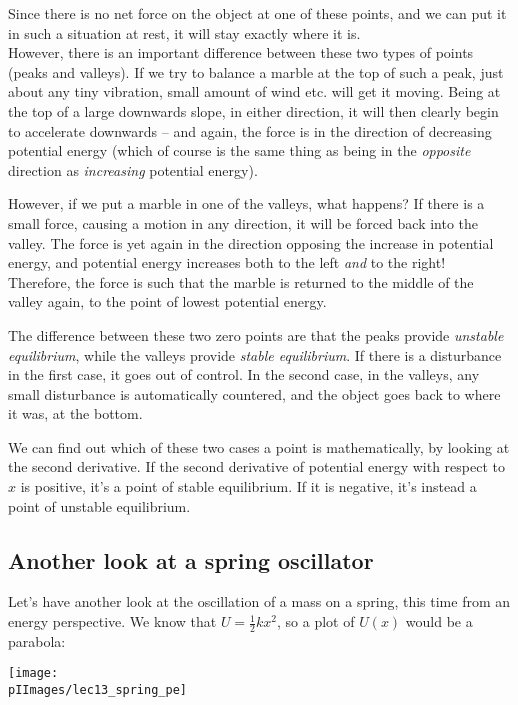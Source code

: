 Since there is no net force on the object at one of these points, and we can put it in such a situation at rest, it will stay exactly where it is.\\
However, there is an important difference between these two types of points  (peaks and valleys). If we try to balance a marble at the top of such a peak, just about any tiny vibration, small amount of wind etc. will get it moving. Being at the top of a large downwards slope, in either direction, it will then clearly begin to accelerate downwards -- and again, the force is in the direction of decreasing potential energy (which of course is the same thing as being in the \emph{opposite} direction as \emph{increasing} potential energy).

However, if we put a marble in one of the valleys, what happens? If there is a small force, causing a motion in any direction, it will be forced back into the valley. The force is yet again in the direction opposing the increase in potential energy, and potential energy increases both to the left \emph{and} to the right! Therefore, the force is such that the marble is returned to the middle of the valley again, to the point of lowest potential energy.

The difference between these two zero points are that the peaks provide \emph{unstable equilibrium}, while the valleys provide \emph{stable equilibrium}. If there is a disturbance in the first case, it goes out of control. In the second case, in the valleys, any small disturbance is automatically countered, and the object goes back to where it was, at the bottom.

We can find out which of these two cases a point is mathematically, by looking at the second derivative. If the second derivative of potential energy with respect to $x$ is positive, it's a point of stable equilibrium. If it is negative, it's instead a point of unstable equilibrium.

\subsection{Another look at a spring oscillator}

Let's have another look at the oscillation of a mass on a spring, this time from an energy perspective. We know that $\displaystyle U = \frac{1}{2} k x^2$, so a plot of $U(x)$ would be a parabola:

\begin{center}
\texttt{[image: \\pIImages/lec13\_spring\_pe]}
\end{center}

